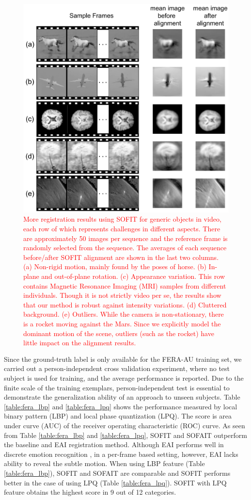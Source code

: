 \documentclass[10pt,journal]{IEEEtran}
\newcommand{\Songfan}[1]{\textcolor{red}{#1}}
\begin{document}
\begin{figure}[htbp]
	\centering
		\includegraphics[width=.65\textwidth]{fig/object_ex.png}
	\caption{\Songfan{More registration results using SOFIT for generic objects in video, each row of which represents challenges in different aspects. There are approximately 50 images per sequence and the reference frame is randomly selected from the sequence. The averages of each sequence before/after SOFIT alignment are shown in the last two columns. (a) Non-rigid motion, mainly found by the poses of horse. (b) In-plane and out-of-plane rotation. (c) Appearance variation. This row contains Magnetic Resonance Imaging (MRI) samples from different individuals. Though it is not strictly video per se, the results show that our method is robust against intensity variations. (d) Cluttered background. (e) Outliers. While the camera is non-stationary, there is a rocket moving against the Mars. Since we explicitly model the dominant motion of the scene, outliers (such as the rocket) have little impact on the alignment results.}}
	\label{fig:object_ex}
\end{figure}

Since the ground-truth label is only available for the FERA-AU training set, we carried out a person-independent cross validation experiment, where no test subject is used for training, and the average performance is reported. Due to the finite scale of the training exemplars, person-independent test is essential to demonstrate the generalization ability of an approach to unseen subjects. Table \ref{table:fera_lbp} and \ref{table:fera_lpq} shows the performance measured by local binary pattern (LBP) and local phase quantization (LPQ). The score is area under curve (AUC) of the receiver operating characteristic (ROC) curve. As seen from Table \ref{table:fera_lbp} and \ref{table:fera_lpq}, SOFIT and SOFAIT outperform the baseline and EAI registration method. Although EAI performs well in discrete emotion recognition \cite{Yang_SMCB12}, in a per-frame based setting, however, EAI lacks ability to reveal the subtle motion. When using LBP feature (Table \ref{table:fera_lbp}), SOFIT and SOFAIT are comparable and SOFIT performs better in the case of using LPQ (Table \ref{table:fera_lpq}). SOFIT with LPQ feature obtains the highest score in 9 out of 12 categories. 
\end{document}
